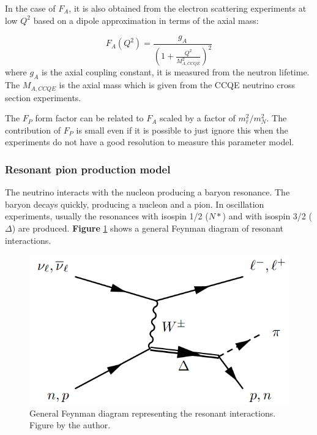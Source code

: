 In the case of $F_A$, it is also obtained from the electron scattering experiments at low $Q^2$ based on a dipole approximation in terms of the axial mass:

\begin{equation}
    F_A(Q^2) = \frac{g_A}{\left(1 + \frac{Q^2}{M^2_{A,CCQE}}\right)^2}
\end{equation}
where $g_A$ is the axial coupling constant, it is measured from the neutron lifetime. The $M_{A,CCQE}$ is the axial mass which is given from the CCQE neutrino cross section experiments.

The $F_P$ form factor can be related to $F_A$ scaled by a factor of $m^2_\ell / m^2_N$. The contribution of $F_P$ is small even if it is possible to just ignore this when the experiments do not have a good resolution to measure this parameter model.


\subsubsection{Resonant pion production model}
\label{Cap:Int:NuInteractions:RESmodel}

The neutrino interacts with the nucleon producing a baryon resonance. The baryon decays quickly, producing a nucleon and a pion. In oscillation experiments, usually the resonances with isospin 1/2 ($N*$) and with isospin 3/2 ($\Delta$) are produced. \textbf{Figure} \ref{fig:Int:NuInteractions:Resmodel:FaymanDiag} shows a general Feynman diagram of resonant interactions.

\begin{figure}[!htb]
    \centering
    \includegraphics[scale=0.3]{Figures/Chapter1/ResonantInt.png}
    \caption{General Feynman diagram representing the resonant interactions. Figure by the author.}
    \label{fig:Int:NuInteractions:Resmodel:FaymanDiag}
\end{figure}

